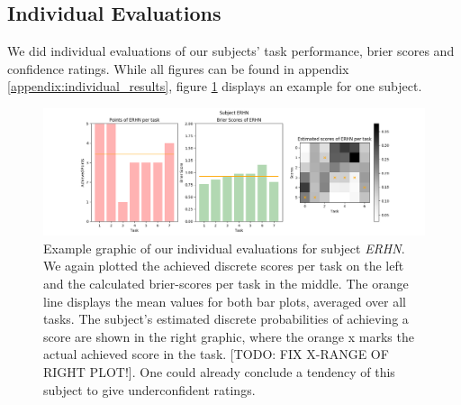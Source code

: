 \documentclass[../main/main.tex]{subfiles}
\begin{document}
\subsection{Individual Evaluations}
We did individual evaluations of our subjects' task performance, brier scores and confidence ratings. While all figures can be found in appendix \ref{appendix:individual_results}, figure \ref{fig:erhn_results} displays an example for one subject.
\begin{figure}[H]
	\centering
	\captionsetup{justification=centering}
	\includegraphics[width=\textwidth]{../assets/ERHN_results.png}
	\caption{Example graphic of our individual evaluations for subject \textit{ERHN}. We again plotted the achieved discrete scores per task on the left and the calculated brier-scores per task in the middle. The orange line displays the mean values for both bar plots, averaged over all tasks. The subject's estimated discrete probabilities of achieving a score are shown in the right graphic, where the orange x marks the actual achieved score in the task. [TODO: FIX X-RANGE OF RIGHT PLOT!]. One could already conclude a tendency of this subject to give underconfident ratings.}
	\label{fig:erhn_results} 
\end{figure}
\end{document}
